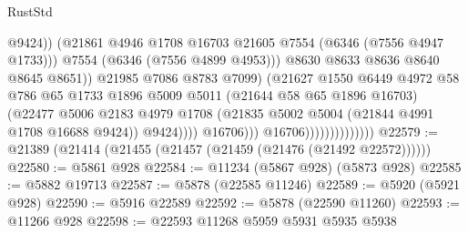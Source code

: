 \begin{lexlean}{RustStd}
\begin{coremodule}
                                                      @9424))
                                                  (@21861
                                                    @4946
                                                    @1708
                                                    @16703
                                                    @21605
                                                    @7554
                                                    (@6346 (@7556 @4947 @1733)))
                                                  @7554
                                                  (@6346 (@7556 @4899 @4953)))
                                                @8630
                                                @8633
                                                @8636
                                                @8640
                                                @8645
                                                @8651))
                                            @21985
                                            @7086
                                            @8783
                                            @7099)
                                          (@21627
                                            @1550
                                            @6449
                                            @4972
                                            @58
                                            @786
                                            @65
                                            @1733
                                            @1896
                                            @5009
                                            @5011
                                            (@21644 @58 @65 @1896 @16703)
                                            (@22477
                                              @5006
                                              @2183
                                              @4979
                                              @1708
                                              (@21835 @5002 @5004 (@21844 @4991 @1708 @16688 @9424))
                                              @9424))))
                                      @16706)))
                                @16706))))))))))))))
@22579 := @21389 (@21414 (@21455 (@21457 (@21459 (@21476 (@21492 @22572))))))
@22580 := @5861 @928
@22584 := @11234 (@5867 @928) (@5873 @928)
@22585 := @5882 @19713
@22587 := @5878 (@22585 @11246)
@22589 := @5920 (@5921 @928)
@22590 := @5916 @22589
@22592 := @5878 (@22590 @11260)
@22593 := @11266 @928
@22598 := @22593 @11268 @5959 @5931 @5935 @5938

\end{coremodule}
\end{lexlean}
